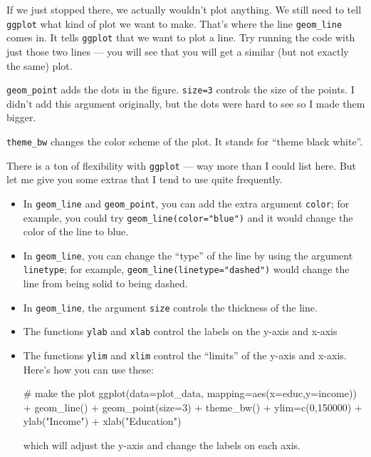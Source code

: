 \documentclass[
  letterpaper,
  DIV=11,
  numbers=noendperiod]{scrreprt}
\newenvironment{Shaded}{\begin{snugshade}}{\end{snugshade}}
\newcommand{\AttributeTok}[1]{\textcolor[rgb]{0.40,0.45,0.13}{#1}}
\newcommand{\CommentTok}[1]{\textcolor[rgb]{0.37,0.37,0.37}{#1}}
\newcommand{\DecValTok}[1]{\textcolor[rgb]{0.68,0.00,0.00}{#1}}
\newcommand{\FunctionTok}[1]{\textcolor[rgb]{0.28,0.35,0.67}{#1}}
\newcommand{\NormalTok}[1]{\textcolor[rgb]{0.00,0.23,0.31}{#1}}
\newcommand{\OtherTok}[1]{\textcolor[rgb]{0.00,0.23,0.31}{#1}}
\newcommand{\SpecialCharTok}[1]{\textcolor[rgb]{0.37,0.37,0.37}{#1}}
\newcommand{\StringTok}[1]{\textcolor[rgb]{0.13,0.47,0.30}{#1}}
\begin{document}
If we just stopped there, we actually wouldn't plot anything. We still
need to tell \texttt{ggplot} what kind of plot we want to make. That's
where the line \texttt{geom\_line} comes in. It tells \texttt{ggplot}
that we want to plot a line. Try running the code with just those two
lines --- you will see that you will get a similar (but not exactly the
same) plot.

\texttt{geom\_point} adds the dots in the figure. \texttt{size=3}
controls the size of the points. I didn't add this argument originally,
but the dots were hard to see so I made them bigger.

\texttt{theme\_bw} changes the color scheme of the plot. It stands for
``theme black white''.

There is a ton of flexibility with \texttt{ggplot} --- way more than I
could list here. But let me give you some extras that I tend to use
quite frequently.

\begin{itemize}
\item
  In \texttt{geom\_line} and \texttt{geom\_point}, you can add the extra
  argument \texttt{color}; for example, you could try
  \texttt{geom\_line(color="blue")} and it would change the color of the
  line to blue.
\item
  In \texttt{geom\_line}, you can change the ``type'' of the line by
  using the argument \texttt{linetype}; for example,
  \texttt{geom\_line(linetype="dashed")} would change the line from
  being solid to being dashed.
\item
  In \texttt{geom\_line}, the argument \texttt{size} controls the
  thickness of the line.
\item
  The functions \texttt{ylab} and \texttt{xlab} control the labels on
  the y-axis and x-axis
\item
  The functions \texttt{ylim} and \texttt{xlim} control the ``limits''
  of the y-axis and x-axis. Here's how you can use these:

\begin{Shaded}
\begin{Highlighting}[]
\CommentTok{\# make the plot}
\FunctionTok{ggplot}\NormalTok{(}\AttributeTok{data=}\NormalTok{plot\_data,}
     \AttributeTok{mapping=}\FunctionTok{aes}\NormalTok{(}\AttributeTok{x=}\NormalTok{educ,}\AttributeTok{y=}\NormalTok{income)) }\SpecialCharTok{+}
  \FunctionTok{geom\_line}\NormalTok{() }\SpecialCharTok{+}
  \FunctionTok{geom\_point}\NormalTok{(}\AttributeTok{size=}\DecValTok{3}\NormalTok{) }\SpecialCharTok{+}
  \FunctionTok{theme\_bw}\NormalTok{() }\SpecialCharTok{+}
\NormalTok{  ylim}\OtherTok{=}\FunctionTok{c}\NormalTok{(}\DecValTok{0}\NormalTok{,}\DecValTok{150000}\NormalTok{) }\SpecialCharTok{+}
  \FunctionTok{ylab}\NormalTok{(}\StringTok{"Income"}\NormalTok{) }\SpecialCharTok{+}
  \FunctionTok{xlab}\NormalTok{(}\StringTok{"Education"}\NormalTok{)}
\end{Highlighting}
\end{Shaded}

  which will adjust the y-axis and change the labels on each axis.
\end{itemize}
\end{document}
